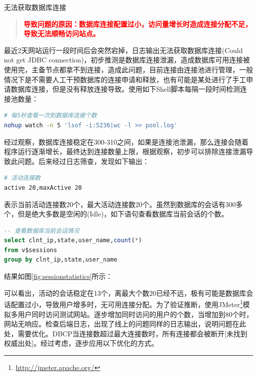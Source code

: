\documentclass[8pt]{book}
\makeatletter
\numberwithin{dummy}{section}
\theoremstyle{ocrenumbox}
\theoremstyle{blacknumex}
\theoremstyle{blacknumbox}
\theoremstyle{ocrenum}
\renewcommand{\subsection}{\@startsection {subsection}{2}{\z@}
	{-3ex \@plus -0.1ex \@minus -.4ex}
	{0.5ex \@plus.2ex }
	{\normalfont\sffamily\bfseries}}
\makeatother
\begin{document}
\subsection{无法获取数据库连接}

\begin{quote}
	\textbf{\textcolor{red}{导致问题的原因：数据库连接配置过小，访问量增长时造成连接分配不足，导致无法顺畅访问站点。}}
\end{quote}

最近2天网站运行一段时间后会突然宕掉，日志输出无法获取数据库连接(Could not get JDBC connection)，初步推测是数据库连接泄漏，造成数据库可用连接被使用完，主备节点都拿不到连接，造成此问题，目前连接由连接池进行管理，一般情况下是不需要人工干预数据库的连接申请和释放，也有可能是某处进行了手工申请数据库连接，但是没有释放连接导致。使用如下Shell脚本每隔一段时间检测连接池数量：

\begin{lstlisting}[language=Bash]
# 每5秒查看一次到数据库连接个数
nohup watch -n 5 'lsof -i:5236|wc -l >> pool.log'
\end{lstlisting}

经过观察，数据库连接稳定在300-310之间，如果是连接池泄漏，那么连接会随着程序运行逐渐增长，最终达到连接数量上限，根据观察，初步可以排除连接泄漏导致此问题。后来经过日志筛查，发现如下输出：

\begin{lstlisting}[language=Bash]
# 活动连接数
active 20,maxActive 20
\end{lstlisting}

表示当前活动连接数20个，最大活动连接数20个。虽然到数据库的会话有300多个，但是绝大多数是空闲的(Idle)，如下语句查看数据库当前会话的个数。

\begin{lstlisting}[language=SQL]
-- 查看数据库当前会话情况
select clnt_ip,state,user_name,count(*)
from v$sessions
group by clnt_ip,state,user_name
\end{lstlisting}

结果如图\ref{fig:sessionstatistics}所示：



可以看出，活动的会话稳定在13个，离最大个数20已经不远，极有可能是数据库会话配置过小，导致用户增多时，无可用连接分配。为了验证推断，使用JMeter\footnote{\url{http://jmeter.apache.org/}}模拟多用户同时访问测试网站。逐步增加同时访问的用户的个数，当增加到80个时，网站无响应。检查后端日志，出现了线上的问题同样的日志输出，说明问题在此处，需要优化。DBCP当连接数超过最大连接数时，所有连接都会被断开[未找到权威出处]。经过考虑，逐步应用以下优化的方式。
\end{document}
